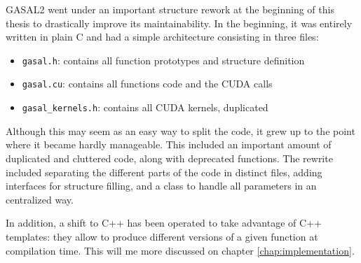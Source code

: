 GASAL2 went under an important structure rework at the beginning of this thesis to drastically improve its maintainability. In the beginning, it was entirely written in plain C and had a simple architecture consisting in three files:

\begin{itemize}
	\item \verb|gasal.h|: contains all function prototypes and structure definition
	\item \verb|gasal.cu|: contains all functions code and the CUDA calls
	\item \verb|gasal_kernels.h|: contains all CUDA kernels, duplicated
\end{itemize}

Although this may seem as an easy way to split the code, it grew up to the point where it became hardly manageable. This included an important amount of duplicated and cluttered code, along with deprecated functions. The rewrite included separating the different parts of the code in distinct files, adding interfaces for structure filling, and a class to  handle all parameters in an centralized way.

In addition, a shift to C++ has been operated to take advantage of C++ templates: they allow to produce different versions of a given function at compilation time. This will me more discussed on chapter \ref{chap:implementation}.





